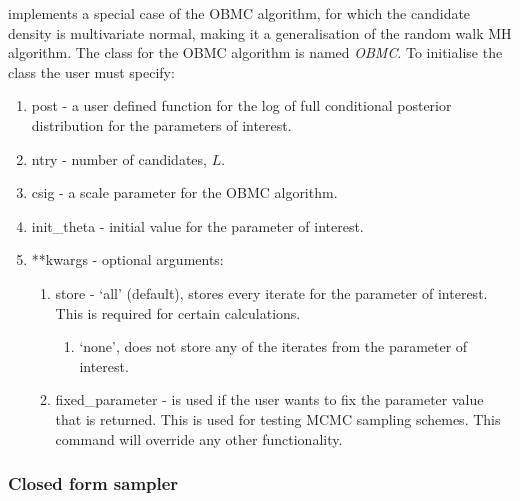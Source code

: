 \documentclass[article]{jss}
\begin{document}
 implements a special case of the OBMC algorithm, for
which the candidate density is multivariate normal, making it a
generalisation of the random walk MH algorithm. The class for the OBMC
algorithm is named \emph{OBMC}. To initialise the class the user must
specify:
\begin{enumerate}
\item post - a user defined function for the log of full conditional
  posterior distribution for the parameters of interest.
\item ntry - number of candidates, $L$.
\item csig - a scale parameter for the OBMC algorithm.
\item init\_theta - initial value for the parameter of interest. 
\item {*}{*}kwargs - optional arguments:

\begin{enumerate}
\item store - `all' (default), stores every iterate for the parameter
  of interest. This is required for certain calculations.

\begin{enumerate}
\item `none', does not store any of the iterates from the parameter of interest. 
\end{enumerate}
\item fixed\_parameter - is used if the user wants to fix the
  parameter value that is returned. This is used for testing MCMC
  sampling schemes.  This command will override any other
  functionality.
\end{enumerate}
\end{enumerate}

\subsubsection{Closed form sampler}
\end{document}
